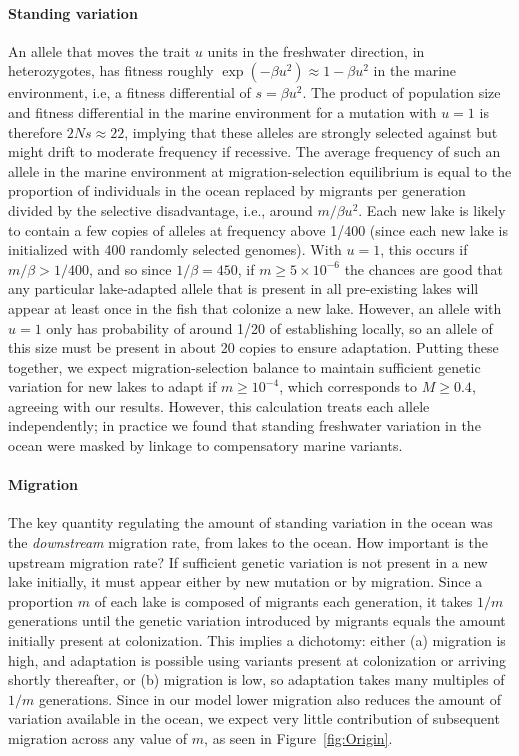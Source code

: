 \documentclass{article}
\begin{document}
\paragraph{Standing variation}
An allele that moves the trait $u$ units in the freshwater direction, in heterozygotes, 
has fitness roughly $\exp(-\beta u^2) \approx 1 - \beta u^2$ in the marine environment, i.e, a fitness differential of $s = \beta u^2$. 
The product of population size and fitness differential in the marine environment for a mutation with $u=1$ is therefore $2Ns \approx 22$,
implying that these alleles are strongly selected against but might drift to moderate frequency if recessive.
The average frequency of such an allele in the marine environment at migration-selection equilibrium 
is equal to the proportion of individuals in the ocean replaced by migrants per generation divided by the selective disadvantage, i.e.,
around $m / \beta u^2$. 
Each new lake is likely to contain a few copies of alleles at frequency above 1/400
(since each new lake is initialized with 400 randomly selected genomes).
With $u=1$, this occurs if $m/\beta > 1/400$,
and so since $1/\beta = 450$, if $m \ge 5 \times 10^{-6}$
the chances are good that any particular lake-adapted allele that is present in all pre-existing lakes 
will appear at least once in the fish that colonize a new lake. 
However, an allele with $u=1$ only has probability of around 1/20 of establishing locally, 
so an allele of this size must be present in about 20 copies to ensure adaptation.
Putting these together, we expect migration-selection balance to maintain sufficient genetic variation
for new lakes to adapt if $m \ge 10^{-4}$, which corresponds to $M \ge 0.4$,
agreeing with our results.
However, this calculation treats each allele independently;
in practice we found that standing freshwater variation in the ocean
were masked by linkage to compensatory marine variants.

\paragraph{Migration}
The key quantity regulating the amount of standing variation in the ocean was the \emph{downstream} migration rate,
from lakes to the ocean.
How important is the upstream migration rate?
If sufficient genetic variation is not present in a new lake initially, 
it must appear either by new mutation or by migration. 
Since a proportion $m$ of each lake is composed of migrants each generation, 
it takes $1/m$ generations until the genetic variation introduced by migrants equals the amount initially present at colonization. 
This implies a dichotomy: either 
(a) migration is high, and adaptation is possible using variants present at colonization or arriving shortly thereafter, or 
(b) migration is low, so adaptation takes many multiples of $1/m$ generations.
Since in our model lower migration also reduces the amount of variation available in the ocean,
we expect very little contribution of subsequent migration across any value of $m$,
as seen in Figure~\ref{fig:Origin}.
\end{document}
